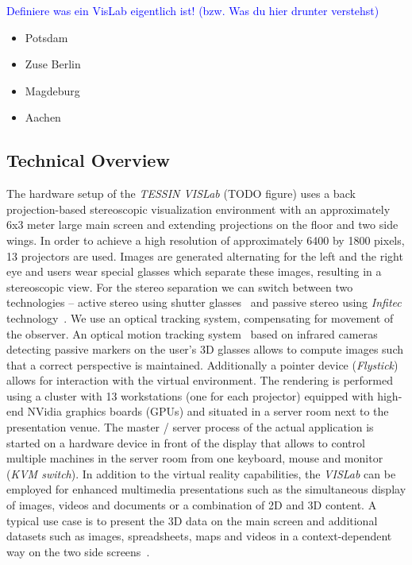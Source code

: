 \documentclass[twocolumn]{svjour3}          %
\newcommand{\myedit}[2]{\textcolor{red}{\st{#1}} \textcolor{blue}{#2}}
\begin{document}
\myedit{}{Definiere was ein VisLab eigentlich ist! (bzw. Was du hier drunter verstehst)}

\begin{itemize}
\itemsep1pt\parskip0pt
\item
  Potsdam
\item
  Zuse Berlin
\item
  Magdeburg
\item
  Aachen
\end{itemize}

\subsection{Technical Overview}
\label{technical-overview}

The hardware setup of the \emph{TESSIN VISLab} (TODO figure) uses a back projection-based stereoscopic visualization environment with an approximately 6x3 meter large main screen and extending projections on the floor and two side wings. In order to achieve a high resolution of approximately 6400 by 1800 pixels, 13 projectors are used. Images are generated alternating for the left and the right eye and users wear special glasses which separate these images, resulting in a stereoscopic view. For the stereo separation we can switch between two technologies -- active stereo using shutter glasses~\cite{activestereo} and passive stereo using \emph{Infitec} technology~\cite{infitec}. We use an optical tracking system, compensating for movement of the observer. An optical motion tracking system~\cite{tracking} based on infrared cameras detecting passive markers on the user's 3D glasses allows to compute images such that a correct perspective is maintained. Additionally a pointer device (\emph{Flystick}) allows for interaction with the virtual environment. The rendering is performed using a cluster with 13 workstations (one for each projector) equipped with high-end NVidia graphics boards (GPUs) and situated in a server room next to the presentation venue. The master / server process of the actual application is started on a hardware device in front of the display that allows to control multiple machines in the server room from one keyboard, mouse and monitor (\emph{KVM switch}). In addition to the virtual reality capabilities, the \emph{VISLab} can be employed for enhanced multimedia presentations such as the simultaneous display of images, videos and documents or a combination of 2D and 3D content. A typical use case is to present the 3D data on the main screen and additional datasets such as images, spreadsheets, maps and videos in a context-dependent way on the two side screens~\cite{zehner:modelcare}.
\end{document}
